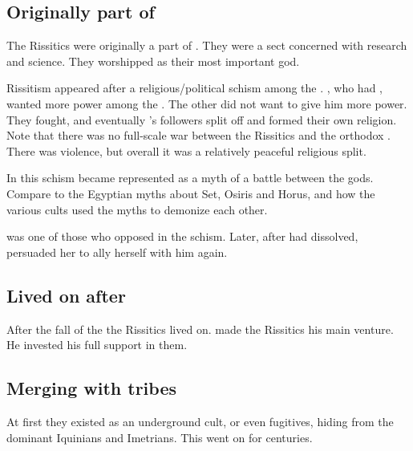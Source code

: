 \subsection{Originally part of \Ortaica}
The Rissitics were originally a part of \Ortaica. 
They were a \rethyactic{} sect concerned with research and science. 
They worshipped \Secherdamon as their most important god. 

Rissitism appeared after a religious/political schism among the \Taorthae. 
\Secherdamon, who had , wanted more power among the \taorthae.
The other \taorthae did not want to give him more power. 
They fought, and eventually \Secherdamon's followers split off and formed their own religion. 
Note that there was no full-scale war between the Rissitics and the orthodox \Ortaicans. 
There was violence, but overall it was a relatively peaceful religious split. 

In  this schism became represented as a myth of a battle between the gods. 
Compare to the Egyptian myths about Set, Osiris and Horus, and how the various cults used the myths to demonize each other. 

\Nzessuacrith was one of those who opposed \Secherdamon in the schism.
Later, after \Ortaica had dissolved, \Secherdamon persuaded her to ally herself with him again. 









\subsection{Lived on after \Ortaica}
After the fall of the \bacconate{} the Rissitics lived on. 
\Secherdamon{} made the Rissitics his main venture. 
He invested his full support in them. 









\subsection{Merging with tribes}
At first they existed as an underground cult, or even fugitives, hiding from the dominant Iquinians and Imetrians. 
This went on for centuries. 


